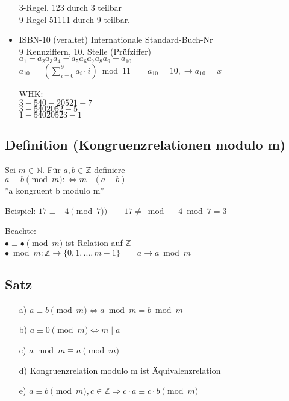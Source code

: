 \documentclass[a4paper, 12pt, twoside] {article}
\begin{document}
\begin{itemize}
3-Regel. 123 durch 3 teilbar \\
9-Regel 51111 durch 9 teilbar.

\item ISBN-10 (veraltet) %
Internationale Standard-Buch-Nr \\
9 Kennziffern, 10. Stelle (Prüfziffer) \\
$a_1 - a_2 a_3 a_4 - a_5 a_6 a_7 a_8 a_9 - a_10$ \\

$a_{10}\ = (\displaystyle\sum^{9}_{i=0} a_i  \cdot  i) \bmod 11 \qquad a_{10} = 10, \rightarrow a_{10} = x$

WHK: \\
$3-540-20521-7$ \\
$3-5402052-5$ \\
$1-54020523-1$

\end{itemize}

\subsection{Definition (Kongruenzrelationen modulo m)} %
Sei $m \in \mathbb{N}$. Für $a, b \in \mathbb{Z}$ definiere \\
$a \equiv b \pmod m : \Leftrightarrow m \mid (a-b)$ \\

''a kongruent b modulo m''

Beispiel: $17 \equiv -4 \pmod 7) \qquad 17 \neq \bmod -4 \bmod 7 = 3$

Beachte: \\
$\bullet \equiv \bullet \pmod m$ ist Relation auf $\mathbb{Z}$ \\
$\bullet \bmod m : \mathbb{Z} \rightarrow \{0, 1, ..., m-1\} \qquad a \rightarrow a \bmod m$

\subsection[Satz (zu Kongruenzrelationen)]{Satz} %
\begin{itemize}

\item[a)] $a \equiv b \pmod m \Leftrightarrow a \bmod m = b \bmod m$
\item[b)] $a \equiv 0 \pmod m \Leftrightarrow m \mid a$
\item[c)] $a \bmod m \equiv a \pmod m$
\item[d)] Kongruenzrelation modulo m ist Äquivalenzrelation
\item[e)] $a \equiv b \pmod m , c \in \mathbb{Z} \Rightarrow c \cdot a \equiv c \cdot b \pmod m$

\end{itemize}
\end{document}
